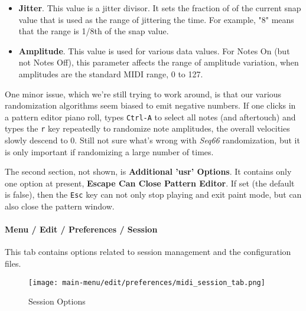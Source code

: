    \begin{itemize}
      \item \textbf{Jitter}.
         This value is a jitter divisor.
         It sets the fraction of of the current snap value that
         is used as the range of jittering the time.
         For example, "8" means that the range is 1/8th of the snap value.
      \item \textbf{Amplitude}.
         This value is used for various data values.
         For Notes On (but not Notes Off), this parameter affects
         the range of amplitude variation, when amplitudes are
         the standard MIDI range, 0 to 127.
   \end{itemize}

   One minor issue, which we're still trying to work around, is that
   our various randomization algorithms seem biased to emit
   negative numbers.
   If one clicks in a pattern editor piano roll, types
   \texttt{Ctrl-A} to select all notes (and aftertouch)
   and types the \texttt{r} key repeatedly to randomize
   note amplitudes, the overall velocities slowly descend to 0.
   Still not sure what's wrong with \textsl{Seq66} randomization, 
   but it is only important if randomizing a large number of times.

   The second section, not shown, is \textbf{Additional 'usr' Options}.
   It contains only one option at present,
   \textbf{Escape Can Close Pattern Editor}.
   If set (the default is false), then the \texttt{Esc}
   key can not only stop playing and exit paint mode, but
   can also close the pattern window.

\paragraph{Menu / Edit / Preferences / Session}
\label{paragraph:menu_edit_preferences_session}

   This tab contains options related to session management and the
   configuration files.

   \setcounter{ItemCounter}{0}      %

\begin{figure}[H]
   \centering 
   \texttt{[image: main-menu/edit/preferences/midi\_session\_tab.png]}
   \caption{Session Options}
   \label{fig:midi_session_options_tab}
\end{figure}

   \setcounter{ItemCounter}{0}      %

